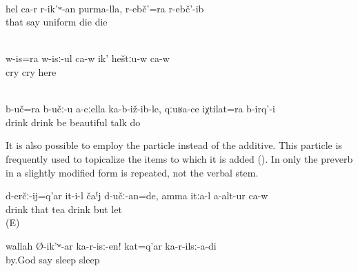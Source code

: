 \begin{exe}
	\\\label{ex:‎She herself said it in that manner}%
	\gll	hel	ca-r	r-ik'ʷ-an	purma-lla,	r-ebč'=ra	r-ebč'-ib\\
		that		say	uniform	\tsc{f-}die	die\\
	\glt	{}

	\\\label{ex:‎And as for crying, he is crying a lot here}%
	\gll	w-is=ra	w-isː-ul	ca-w	ik'	heštːu-w	ca-w\\
		cry	cry			here	\\
	\glt	{}

	\\\label{ex:As for drinking, they sit and drink with you, and (we) had nice conversations}%
	\gll	b-uč=ra	b-učː-u	a-cːella	ka-b-iž-ib-le, qːuʁa-ce	iχtilat=ra b-irq'-i\\
		drink	drink		be beautiful	talk	do\\
	\glt	{}
\end{exe}

It is also possible to employ the particle  instead of the additive. This particle is frequently used to topicalize the items to which it is added (). In  only the preverb in a slightly modified form is repeated, not the verbal stem.
%
\begin{exe}
	\ex	\label{ex:‎As for drinking, he would have drunk the tea, but they did not let him}
	\gll	d-erčː-ij=q'ar	it-i-l	čaˁj	d-učː-an=de,	amma	itːa-l	a-alt-ur	ca-w\\
		drink	that	tea	drink	but		let	\\
	\glt	{} (E)
	
		\ex	\label{ex:By God, he says, lay down (in the hospital)}
	\gll	wallah	Ø-ik'ʷ-ar		ka-r-isː-en!	kat=q'ar	ka-r-ilsː-a-di\\
		by.God	say		sleep 	sleep\\
	\glt	{}
	
\end{exe}

